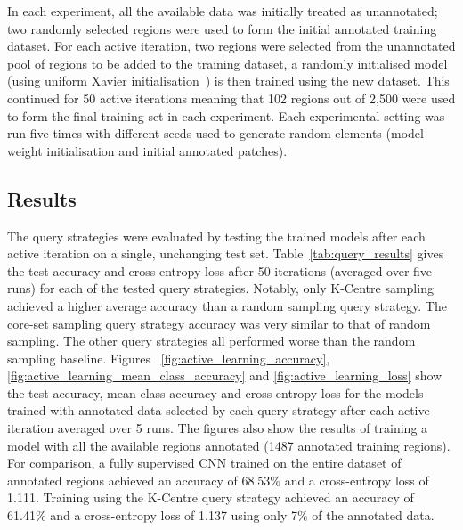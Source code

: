 In each experiment, all the available data was initially treated as unannotated; two randomly selected regions were used to form the initial annotated training dataset. For each active iteration, two regions were selected from the unannotated pool of regions to be added to the training dataset, a randomly initialised model (using uniform Xavier initialisation~\citep{glorot2010understanding}) is then trained using the new dataset. This continued for 50 active iterations meaning that 102 regions out of 2,500 were used to form the final training set in each experiment. Each experimental setting was run five times with different seeds used to generate random elements (model weight initialisation and initial annotated patches).

\subsection{Results}
\label{subsec:active_results}
The query strategies were evaluated by testing the trained models after each active iteration on a single, unchanging test set. Table~\ref{tab:query_results} gives the test accuracy and cross-entropy loss after 50 iterations (averaged over five runs) for each of the tested query strategies. Notably, only K-Centre sampling achieved a higher average accuracy than a random sampling query strategy. The core-set sampling query strategy accuracy was very similar to that of random sampling. The other query strategies all performed worse than the random sampling baseline. Figures ~\ref{fig:active_learning_accuracy}, \ref{fig:active_learning_mean_class_accuracy} and \ref{fig:active_learning_loss} show the test accuracy, mean class accuracy and cross-entropy loss for the models trained with annotated data selected by each query strategy after each active iteration averaged over 5 runs. The figures also show the results of training a model with all the available regions annotated (1487 annotated training regions). For comparison, a fully supervised CNN trained on the entire dataset of annotated regions achieved an accuracy of 68.53\% and a cross-entropy loss of 1.111. Training using the K-Centre query strategy achieved an accuracy of 61.41\% and a cross-entropy loss of 1.137 using only 7\% of the annotated data.

